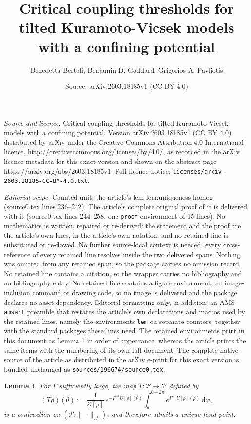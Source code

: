 \documentclass[10pt,a4paper]{amsart}
\title{Critical coupling thresholds for tilted Kuramoto-Vicsek models with a confining potential}
\author{Benedetta Bertoli, Benjamin D. Goddard, Grigorios A. Pavliotis}
\date{Source: arXiv:2603.18185v1 (CC BY 4.0)}
\newtheorem{lem}{Lemma}
\begin{document}
\maketitle

\noindent\emph{Source and licence.} Critical coupling thresholds for tilted Kuramoto-Vicsek models with a confining potential. Version arXiv:2603.18185v1 (CC BY 4.0), distributed by arXiv under the Creative Commons Attribution 4.0 International licence, http://creativecommons.org/licenses/by/4.0/, as recorded in the arXiv licence metadata for this exact version and shown on the abstract page https://arxiv.org/abs/2603.18185v1. Full licence notice: \texttt{licenses/arxiv-2603.18185-CC-BY-4.0.txt}.\par\smallskip

\noindent\textit{Editorial scope.} Counted unit: the article's lem lem:uniqueness-homog (source0.tex lines 236--242). The article's complete original proof of it is delivered with it (source0.tex lines 244--258, one \texttt{proof} environment of 15 lines). No mathematics is written, repaired or re-derived: the statement and the proof are the article's own lines, in the article's own notation, and no retained line is substituted or re-flowed.  No further source-local context is needed: every cross-reference of every retained line resolves inside the two delivered spans.  Nothing was omitted from any retained span, so the package carries no omission record.  No retained line contains a citation, so the wrapper carries no bibliography and no bibliography entry.  No retained line contains a figure environment, an image-inclusion command or drawing code, so no image is delivered and the package declares no asset dependency.  Editorial formatting only, in addition: an AMS \texttt{amsart} preamble that restates the article's own declarations and macros used by the retained lines, namely the environments \texttt{lem} on separate counters, together with the standard packages those lines need.  The retained environments print in this document as Lemma 1 in order of appearance, whereas the article prints the same items with the numbering of its own full document.  The complete native source of the article as distributed in the arXiv e-print for this exact version is bundled unchanged as \texttt{sources/196674/source0.tex}.
\begin{lem}\label{lem:uniqueness-homog}
For $\Gamma$ sufficiently large, the map $T:\mathcal{P}\to\mathcal{P}$ defined by
\[
    (T\rho)(\theta) := \frac{1}{Z[\rho]}\,e^{-\Gamma^{-1} U[\rho](\theta)} \int_\theta^{\theta + 2\pi} e^{\Gamma^{-1} U[\rho](\varphi)}\,\mathrm{d}\varphi,
\]
is a contraction on $(\mathcal{P}, \|\cdot\|_{L^1})$, and therefore admits a unique fixed point.
\end{lem}
\end{document}
